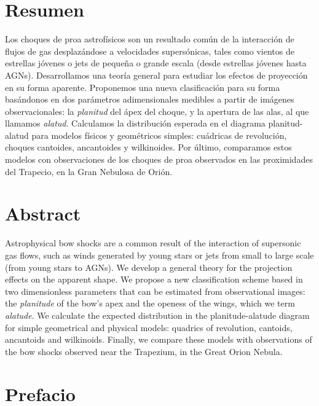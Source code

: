 \documentclass[11pt, twoside]{book}
\begin{document}
\section*{\centering Resumen}

Los choques de proa astrofísicos son un resultado común de la interacción de flujos de gas desplazándose a velocidades supersónicas, tales como vientos de estrellas jóvenes o jets de pequeña o grande escala (desde estrellas jóvenes hasta AGNs). Desarrollamos una teoría general para estudiar los efectos de proyección en su forma aparente. Proponemos una nueva clasificación para su forma basándonos en dos parámetros adimensionales medibles a partir de imágenes observacionales: la \textit{planitud} del ápex del choque, y la apertura de las alas, al que llamamos \textit{alatud}. Calculamos la distribución esperada en el diagrama planitud-alatud para modelos físicos y geométricos simples: cuádricas de revolución, choques cantoides, ancantoides y wilkinoides. Por último, comparamos estos modelos con observaciones de los choques de proa observados en las proximidades del Trapecio, en la Gran Nebulosa de Orión.


\section*{\centering Abstract}

  Astrophysical bow shocks are a common result of the interaction of supersonic gas flows, such as winds generated by young stars or jets from small to large scale (from young stars to AGNs). We develop a general theory for the projection effects on the apparent shape. We propose a new classification scheme based in two dimensionless parameters that can be estimated from observational images: the \textit{planitude} of the bow's apex and the openess of the wings, which we term \textit{alatude}. We calculate the expected distribution in the planitude-alatude diagram for simple geometrical and physical models: quadrics of revolution, cantoids, ancantoids and wilkinoids. Finally, we compare these models with observations of the bow shocks observed near the Trapezium, in the Great Orion Nebula.

\newpage
\section*{\centering Prefacio}
\end{document}
